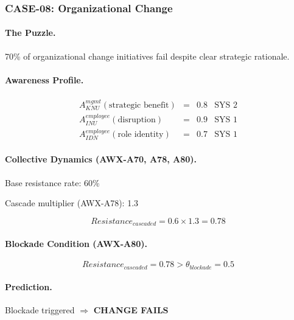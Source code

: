 \subsubsection{CASE-08: Organizational Change}

\paragraph{The Puzzle.}
70\% of organizational change initiatives fail despite clear strategic rationale.

\paragraph{Awareness Profile.}

\begin{equation}
\begin{array}{lcll}
A^{mgmt}_{KNU}(\text{strategic benefit}) & = & 0.8 & \text{SYS 2} \\
A^{employee}_{INU}(\text{disruption}) & = & 0.9 & \text{SYS 1} \\
A^{employee}_{IDN}(\text{role identity}) & = & 0.7 & \text{SYS 1}
\end{array}
\end{equation}

\paragraph{Collective Dynamics (AWX-A70, A78, A80).}

Base resistance rate: 60\%

Cascade multiplier (AWX-A78): 1.3

\begin{equation}
Resistance_{cascaded} = 0.6 \times 1.3 = \mathbf{0.78}
\end{equation}

\paragraph{Blockade Condition (AWX-A80).}
\begin{equation}
Resistance_{cascaded} = 0.78 > \theta_{blockade} = 0.5
\end{equation}

\paragraph{Prediction.}
Blockade triggered $\Rightarrow$ \textbf{CHANGE FAILS}

